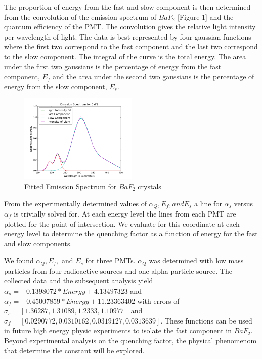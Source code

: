 \documentclass{article}
\begin{document}
The proportion of energy from the fast and slow component is then determined from the convolution of the emission spectrum of $BaF_2$ [Figure 1] and the quantum efficiency of the PMT. The convolution gives the relative light intensity per wavelength of light. The data is best represented by four gaussian functions where the first two correspond to the fast component and the last two correspond to the slow component. The integral of the curve is the total energy. The area under the first two gaussians is the percentage of energy from the fast component, $E_f$ and the area under the second two gaussians is the percentage of energy from the slow component, $E_s$. 

\begin{figure}
  \centering
    \includegraphics[width=0.5\textwidth]{FitsBaF2.png}
  \caption{Fitted Emission Spectrum for $BaF_2$ crystals}
  \label{fig:workflowedge}
\end{figure} 

From the experimentally determined values of $\alpha_Q, E_f, and E_s$ a line for $\alpha_s$ versus $\alpha_f$ is trivially solved for. At each energy level the lines from each PMT are plotted for the point of intersection. We evaluate for this coordinate at each energy level to determine the quenching factor as a function of energy for the fast and slow components. 

We found $\alpha_Q, E_f,$ and $E_s$ for three PMTs. $\alpha_Q$ was determined with low mass particles from four radioactive sources and one alpha particle source. The collected data and the subsequent analysis yield $\alpha_s = -0.1398072 * Energy + 4.13497323$ and $\alpha_f = -0.45007859 * Energy + 11.23363402$ with errors of $\sigma_s = [1.36287, 1.31089, 1.2333, 1.10977]$ and $\sigma_f = [0.0290772, 0.0310162, 0.0319127, 0.0313639]$. These functions can be used in future high energy physic experiments to isolate the fast component in $BaF_2$. Beyond experimental analysis on the quenching factor, the physical phenomenom that determine the constant will be explored. 
\end{document}
